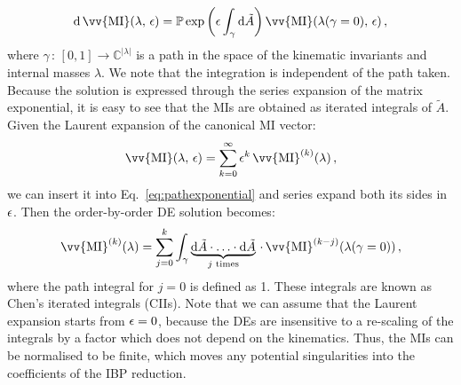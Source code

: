 \documentclass[main.tex]{subfiles}
\begin{document}
\begin{equation} \label{eq:pathexponential}
    \dd \,\vv{\text{MI}}(\lambda,\, \eps) = \mathbb{P} \exp \left(\eps\int_\gamma \dd \tilde{A} \right) \vv{\text{MI}}(\lambda(\gamma=0),\,\eps )\,,
\end{equation}
where $\gamma\,:\,[0, 1] \rightarrow \mathbb{C}^{|\lambda|}$ is a path in the space of the kinematic invariants and internal masses $\lambda$. We note that the integration is independent of the path taken. Because the solution is expressed through the series expansion of the matrix exponential, it is easy to see that the MIs are obtained as iterated integrals of $\tilde{A}$. Given the Laurent expansion of the canonical MI vector:
\begin{equation} \label{eq:MIlaurentexp}
    \vv{\text{MI}}(\lambda, \, \eps) = \sum_{k=0}^\infty \eps^k\,\vv{\text{MI}}^{(k)}(\lambda) \,,
\end{equation}
we can insert it into Eq.~\ref{eq:pathexponential} and series expand both its sides in $\epsilon$. Then the order-by-order DE solution becomes:
\begin{equation} \label{eq:DEssolution}
    \vv{\text{MI}}^{(k)}(\lambda) = \sum_{j=0}^k \int_\gamma \underbrace{\dd \tilde{A} \cdot \ldots \cdot \dd \tilde{A}}_{j\text{ times}} \, \cdot \, \vv{\text{MI}}^{(k-j)}(\lambda(\gamma=0))\,,
\end{equation}
where the path integral for $j=0$ is defined as 1\cite{Chen:1977oja}. These integrals are known as Chen's iterated integrals (CIIs). Note that we can assume that the Laurent expansion starts from $\epsilon=0$, because the DEs are insensitive to a re-scaling of the integrals by a factor which does not depend on the kinematics. Thus, the MIs can be normalised to be finite, which moves any potential singularities into the coefficients of the IBP reduction. 
\end{document}
